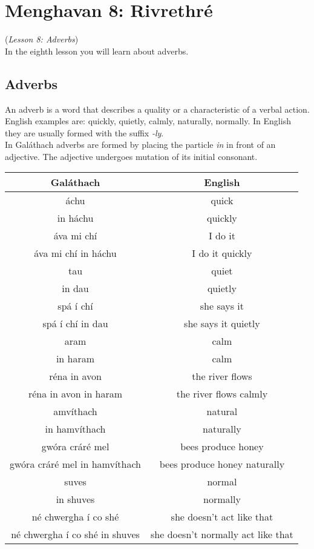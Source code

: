 \section{Menghavan 8: Rivrethr\'{e}}
(\textit{Lesson 8: Adverbs})\\

In the eighth lesson you will learn about adverbs.

\subsection{Adverbs}

An adverb is a word that describes a quality or a characteristic of a verbal action.\\
English examples are: quickly, quietly, calmly, naturally, normally. In English they are usually formed with the suffix \textit{-ly}.\\
In Gal\'{a}thach adverbs are formed by placing the particle \textit{in} in front of an adjective. The adjective undergoes mutation of its initial consonant.
\begin{table}[H]
\centering
\begin{tabu}{c|c}
  \textbf{Gal\'{a}thach} & \textbf{English}\\
  \toprule
  \'{a}chu & quick\\
  in h\'{a}chu & quickly\\
  \'{a}va mi ch\'{i} & I do it\\
  \'{a}va mi ch\'{i} in h\'{a}chu & I do it quickly\\
  \midrule
  tau & quiet\\
  in dau & quietly\\
  sp\'{a} \'{i} ch\'{i} & she says it\\
  sp\'{a} \'{i} ch\'{i} in dau & she says it quietly\\
  \midrule
  aram & calm\\
  in haram & calm\\
  r\'{e}na in avon & the river flows\\
  r\'{e}na in avon in haram & the river flows calmly\\
  \midrule
  amv\'{i}thach & natural\\
  in hamv\'{i}thach & naturally\\
  gw\'{o}ra cr\'{a}r\'{e} mel & bees produce honey\\
  gw\'{o}ra cr\'{a}r\'{e} mel in hamv\'{i}thach & bees produce honey naturally\\
  \midrule
  suves & normal\\
  in shuves & normally\\
  n\'{e} chwergha \'{i} co sh\'{e} & she doesn't act like that\\
  n\'{e} chwergha \'{i} co sh\'{e} in shuves & she doesn't normally act like that
\end{tabu}
\label{examples_adverb}
\end{table}

